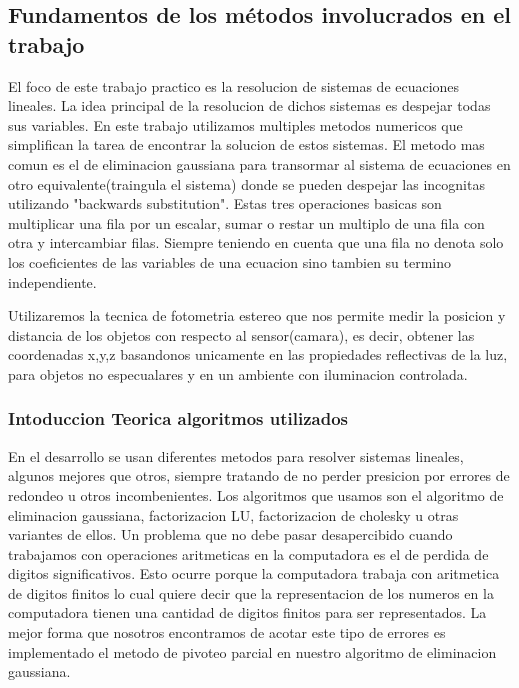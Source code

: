 \subsection{Fundamentos de los métodos involucrados en el trabajo}


El foco de este trabajo practico es la resolucion de sistemas de ecuaciones lineales. La idea principal de la resolucion de dichos sistemas es despejar todas sus variables. 
En este trabajo utilizamos multiples metodos numericos que simplifican la tarea de encontrar la solucion de estos sistemas. 
El metodo mas comun es el de eliminacion gaussiana para transormar al sistema de ecuaciones en otro equivalente(traingula el sistema) donde se pueden despejar las incognitas utilizando "backwards substitution". 
Estas tres operaciones basicas son multiplicar una fila por un escalar, sumar o restar un multiplo de una fila con otra y intercambiar filas. Siempre teniendo en cuenta que una fila no denota solo los coeficientes de las variables de una ecuacion sino tambien su termino independiente.



Utilizaremos la tecnica de fotometria estereo que nos permite medir la posicion y distancia de los objetos con respecto al sensor(camara), es decir, obtener las coordenadas x,y,z basandonos unicamente en las propiedades reflectivas de la luz, para objetos no especualares y en un ambiente con iluminacion controlada.


\subsubsection{Intoduccion Teorica algoritmos utilizados}

En el desarrollo se usan diferentes metodos para resolver sistemas lineales, algunos mejores que otros, siempre tratando de no perder presicion por errores de redondeo u otros incombenientes.
Los algoritmos que usamos son el algoritmo de eliminacion gaussiana, factorizacion LU, factorizacion de cholesky u otras variantes de ellos.
Un problema que no debe pasar desapercibido cuando trabajamos con operaciones aritmeticas en la computadora es el de perdida de digitos significativos. Esto ocurre porque la computadora trabaja con aritmetica de digitos finitos lo cual quiere decir que la representacion de los numeros en la computadora tienen una cantidad de digitos finitos para ser representados.
La mejor forma que nosotros encontramos de acotar este tipo de errores es implementado el metodo de pivoteo parcial en nuestro algoritmo de eliminacion gaussiana.

